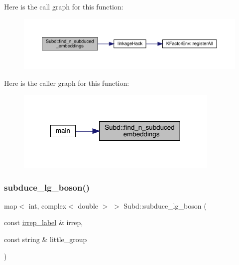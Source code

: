 Here is the call graph for this function\+:\nopagebreak
\begin{figure}[H]
\begin{center}
\leavevmode
\includegraphics[width=350pt]{d8/d2b/namespaceSubd_a7a3fcd97f1cf40eb963e278240d0ff3e_cgraph}
\end{center}
\end{figure}
Here is the caller graph for this function\+:\nopagebreak
\begin{figure}[H]
\begin{center}
\leavevmode
\includegraphics[width=275pt]{d8/d2b/namespaceSubd_a7a3fcd97f1cf40eb963e278240d0ff3e_icgraph}
\end{center}
\end{figure}
\mbox{\label{namespaceSubd_a5f31b3ef70ad25320a8010ec3017eb04}} 
\subsubsection{\texorpdfstring{subduce\_lg\_boson()}{subduce\_lg\_boson()}}
{\footnotesize\ttfamily map$<$ int, complex$<$ double $>$ $>$ Subd\+::subduce\+\_\+lg\+\_\+boson (\begin{DoxyParamCaption}\item[{const \mbox{\hyperlink{structirrep__label}{irrep\+\_\+label}} \&}]{irrep,  }\item[{const string \&}]{little\+\_\+group }\end{DoxyParamCaption})}

